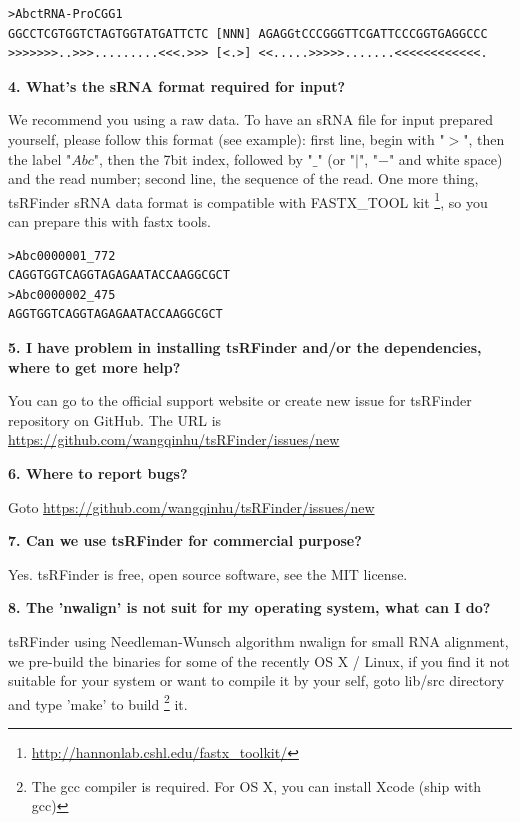 \documentclass[11pt, a4paper]{article}
\begin{document}
{\scriptsize \begin{tcolorbox}[colback=blue!5!white,colframe=blue!75!black,title=tRNA example]
\begin{verbatim}
>AbctRNA-ProCGG1
GGCCTCGTGGTCTAGTGGTATGATTCTC [NNN] AGAGGtCCCGGGTTCGATTCCCGGTGAGGCCC
>>>>>>>..>>>.........<<<.>>> [<.>] <<.....>>>>>.......<<<<<<<<<<<<.
\end{verbatim}
\end{tcolorbox}}

\textbf{4. What's the sRNA format required for input?}

We recommend you using a raw data. To have an sRNA file for input prepared yourself, please follow this format (see example): first line, begin with "$>$", then the label "$Abc$", then the 7\-bit index, followed by "$\_$" (or "$|$", "$-$" and white space) and the read number; second line, the sequence of the read. One more thing, tsRFinder sRNA data format is compatible with FASTX\_TOOL kit \footnote{\url{http://hannonlab.cshl.edu/fastx_toolkit/}}, so you can prepare this with fastx tools. 

{\scriptsize \begin{tcolorbox}[colback=blue!5!white,colframe=blue!75!black,title=sRNA example]
\begin{verbatim}
>Abc0000001_772
CAGGTGGTCAGGTAGAGAATACCAAGGCGCT
>Abc0000002_475
AGGTGGTCAGGTAGAGAATACCAAGGCGCT
\end{verbatim}
\end{tcolorbox}}


\textbf{5. I have problem in installing tsRFinder and/or the dependencies, where to get more help?}

You can go to the official support website or create new issue for tsRFinder repository on GitHub. The URL is \url{https://github.com/wangqinhu/tsRFinder/issues/new}

\textbf{6. Where to report bugs?}

Goto \url{https://github.com/wangqinhu/tsRFinder/issues/new}

\textbf{7. Can we use tsRFinder for commercial purpose?}

Yes. tsRFinder is free, open source software, see the MIT license.

\textbf{8. The 'nwalign' is not suit for my operating system, what can I do?}
 
tsRFinder using Needleman-Wunsch algorithm nwalign for small RNA alignment, we pre-build the binaries for some of the recently OS X / Linux, if you find it not suitable for your system or want to compile it by your self, goto lib/src directory and type 'make' to build \footnote{The gcc compiler is required. For OS X, you can install Xcode (ship with gcc)} it.
\end{document}
